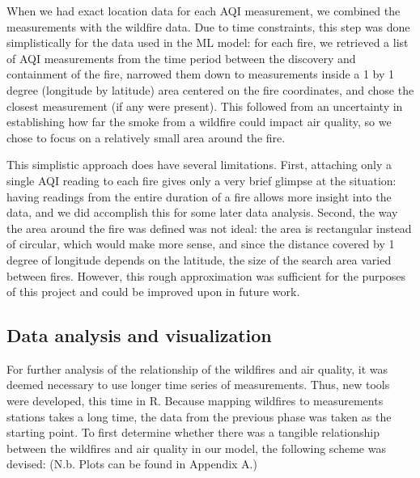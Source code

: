 \documentclass[a4paper,12pt]{article}
\begin{document}
When we had exact location data for each AQI measurement, we combined the measurements with the wildfire data. Due to time constraints, this step was done simplistically for the data used in the ML model: for each fire, we retrieved a list of AQI measurements from the time period between the discovery and containment of the fire, narrowed them down to measurements inside a 1 by 1 degree (longitude by latitude) area centered on the fire coordinates, and chose the closest measurement (if any were present). This followed from an uncertainty in establishing how far the smoke from a wildfire could impact air quality, so we chose to focus on a relatively small area around the fire.

This simplistic approach does have several limitations. First, attaching only a single AQI reading to each fire gives only a very brief glimpse at the situation: having readings from the entire duration of a fire allows more insight into the data, and we did accomplish this for some later data analysis. Second, the way the area around the fire was defined was not ideal: the area is rectangular instead of circular, which would make more sense, and since the distance covered by 1 degree of longitude depends on the latitude, the size of the search area varied between fires. However, this rough approximation was sufficient for the purposes of this project and could be improved upon in future work.

\subsection{Data analysis and visualization}

For further analysis of the relationship of the wildfires and air quality, it was deemed necessary to use longer time series of measurements. Thus, new tools were developed, this time in R. Because mapping wildfires to measurements stations takes a long time, the data from the previous phase was taken as the starting point. To first determine whether there was a tangible relationship between the wildfires and air quality in our model, the following scheme was devised: (N.b. Plots can be found in Appendix A.)
\end{document}
